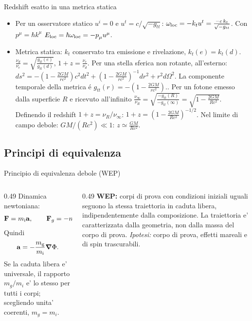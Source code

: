 \begin{frame}[t]{Redshift esatto in una metrica statica}
\begin{itemize}
    \item Per un osservatore statico $u^i=0$ e $u^t=c/\sqrt{-g_{tt}}$: $\omega_{\rm loc} =-k_tu^t=\frac{-c\,k_t}{\sqrt{-g_{tt}}}$. Con $p^\mu=\hbar k^\mu$ $E_{\rm loc}=\hbar\omega_{\rm loc}=-\tensor{p}{_\mu}\tensor{u}{^\mu}$.
    \item Metrica statica: $k_t$ conservato tra emissione e rivelazione, $k_t(e)=k_t(d)$. $\frac{\nu_d}{\nu_e}=\sqrt{\frac{g_{tt}(e)}{g_{tt}(d)}}$, $1+z=\frac{\nu_e}{\nu_d}$. Per una stella sferica non rotante, all'esterno: $ds^2=-\left(1-\frac{2GM}{rc^2}\right)c^2dt^2+\left(1-\frac{2GM}{rc^2}\right)^{-1}dr^2+r^2d\Omega^2$. La componente temporale della metrica \'e $g_{tt}(r)=-\left(1-\frac{2GM}{rc^2}\right).$. Per un fotone emesso dalla superficie $R$ e ricevuto all'infinito $\frac{\nu_\infty}{\nu_R}=\sqrt{\frac{-g_{tt}(R)}{-g_{tt}(\infty)}}=\sqrt{1-\frac{2GM}{Rc^2}}$. Definendo il redshift $1+z=\nu_R/\nu_\infty$: $1+z=\left(1-\frac{2GM}{Rc^2}\right)^{-1/2}$. Nel limite di campo debole: $GM/(Rc^2)\ll1$: $z\simeq\frac{GM}{Rc^2}$.
\end{itemize}
\end{frame}

\subsection{Principi di equivalenza}

\begin{frame}[t]{Principio di equivalenza debole (WEP)}\small\raggedright

\begin{columns}[T,onlytextwidth]
\begin{column}{0.49\textwidth}
Dinamica newtoniana:
\[
\mathbf F=m_{\rm i}\mathbf a,\qquad
\mathbf F_g=-m_{\rm g}\boldsymbol\nabla\Phi.
\]
Quindi
\[
\mathbf a=-\frac{m_{\rm g}}{m_{\rm i}}\boldsymbol\nabla\Phi.
\]
Se la caduta libera e' universale, il rapporto $m_g/m_i$ e' lo stesso per tutti i corpi; scegliendo unita' coerenti, $m_g=m_i$.
\end{column}
\begin{column}{0.49\textwidth}
\textbf{WEP:} corpi di prova con condizioni iniziali uguali seguono la stessa traiettoria in caduta libera, indipendentemente dalla composizione.
\medskip
La traiettoria e' caratterizzata dalla geometria, non dalla massa del corpo di prova.
\medskip
\textit{Ipotesi:} corpo di prova, effetti mareali e di spin trascurabili.
\end{column}
\end{columns}

\end{frame}

